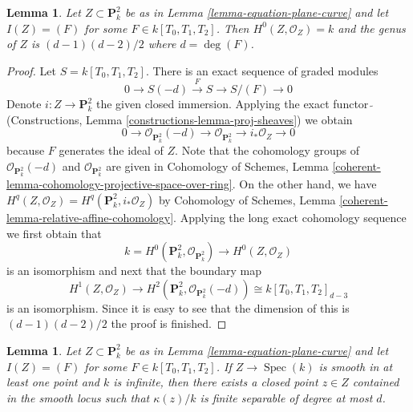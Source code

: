 \documentclass{stacks-project}
\theoremstyle{plain}
\newtheorem{lemma}[subsection]{Lemma}
\theoremstyle{definition}
\theoremstyle{remark}
\numberwithin{equation}{subsection}
\def\Spec{\mathop{\mathrm{Spec}}}
\begin{document}
\begin{lemma}
\label{lemma-genus-plane-curve}
Let $Z \subset \mathbf{P}^2_k$ be as in Lemma \ref{lemma-equation-plane-curve}
and let $I(Z) = (F)$ for some $F \in k[T_0, T_1, T_2]$.
Then $H^0(Z, \mathcal{O}_Z) = k$ and the genus of $Z$ is
$(d - 1)(d - 2)/2$ where $d = \deg(F)$.
\end{lemma}

\begin{proof}
Let $S = k[T_0, T_1, T_2]$.
There is an exact sequence of graded modules
$$
0 \to S(-d) \xrightarrow{F} S \to S/(F) \to 0
$$
Denote $i : Z \to \mathbf{P}^2_k$ the given closed immersion.
Applying the exact functor $\widetilde{\ }$
(Constructions, Lemma \ref{constructions-lemma-proj-sheaves})
we obtain
$$
0 \to \mathcal{O}_{\mathbf{P}^2_k}(-d) \to
\mathcal{O}_{\mathbf{P}^2_k} \to i_*\mathcal{O}_Z \to 0
$$
because $F$ generates the ideal of $Z$.
Note that the cohomology groups of $\mathcal{O}_{\mathbf{P}^2_k}(-d)$ and
$\mathcal{O}_{\mathbf{P}^2_k}$ are given in
Cohomology of Schemes, Lemma
\ref{coherent-lemma-cohomology-projective-space-over-ring}.
On the other hand, we have
$H^q(Z, \mathcal{O}_Z) = H^q(\mathbf{P}^2_k, i_*\mathcal{O}_Z)$ by
Cohomology of Schemes, Lemma \ref{coherent-lemma-relative-affine-cohomology}.
Applying the long exact cohomology sequence
we first obtain that
$$
k = H^0(\mathbf{P}^2_k, \mathcal{O}_{\mathbf{P}^2_k}) \longrightarrow
H^0(Z, \mathcal{O}_Z)
$$
is an isomorphism and next that the boundary map
$$
H^1(Z, \mathcal{O}_Z) \longrightarrow
H^2(\mathbf{P}^2_k, \mathcal{O}_{\mathbf{P}^2_k}(-d)) \cong
k[T_0, T_1, T_2]_{d - 3}
$$
is an isomorphism. Since it is easy to see that the dimension of this
is $(d - 1)(d - 2)/2$ the proof is finished.
\end{proof}

\begin{lemma}
\label{lemma-smooth-plane-curve-point-over-separable}
Let $Z \subset \mathbf{P}^2_k$ be as in Lemma \ref{lemma-equation-plane-curve}
and let $I(Z) = (F)$ for some $F \in k[T_0, T_1, T_2]$.
If $Z \to \Spec(k)$ is smooth in at least one point and $k$ is infinite, then
there exists a closed point $z \in Z$ contained in the smooth
locus such that $\kappa(z)/k$ is finite separable of degree
at most $d$.
\end{lemma}
\end{document}
